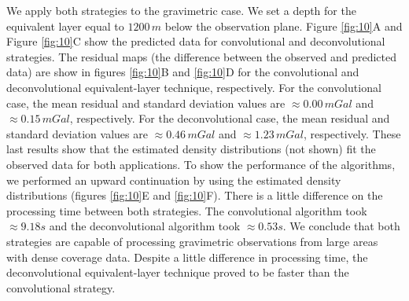 We apply both strategies to the gravimetric case. We set a depth for the equivalent layer equal to $1200 \, m$ below the observation plane. 
Figure \ref{fig:10}A and Figure \ref{fig:10}C show the predicted data for convolutional and deconvolutional strategies. 
The residual maps (the difference between the observed and predicted data) are show in figures \ref{fig:10}B and \ref{fig:10}D 
for the convolutional and deconvolutional equivalent-layer technique, respectively. For the convolutional case, the mean 
residual and standard deviation values are $\approx 0.00 \, mGal$ and $\approx 0.15 \, mGal$, respectively. 
For the deconvolutional case, the mean residual and standard deviation values are $\approx 0.46 \, mGal$ and $\approx 1.23 \, mGal$, respectively. 
These last results show that the estimated density distributions (not shown) fit the observed data for both applications. 
To show the performance of the algorithms, we performed an upward continuation by using the estimated density distributions 
(figures \ref{fig:10}E and \ref{fig:10}F). There is a little difference on the processing time between both strategies. 
The convolutional algorithm took $\approx 9.18 s$ and the deconvolutional algorithm took $\approx 0.53 s$. 
We conclude that both strategies are capable of processing gravimetric observations from large areas with dense coverage data. 
Despite a little difference in processing time, the deconvolutional equivalent-layer technique proved to be faster than the convolutional strategy.

